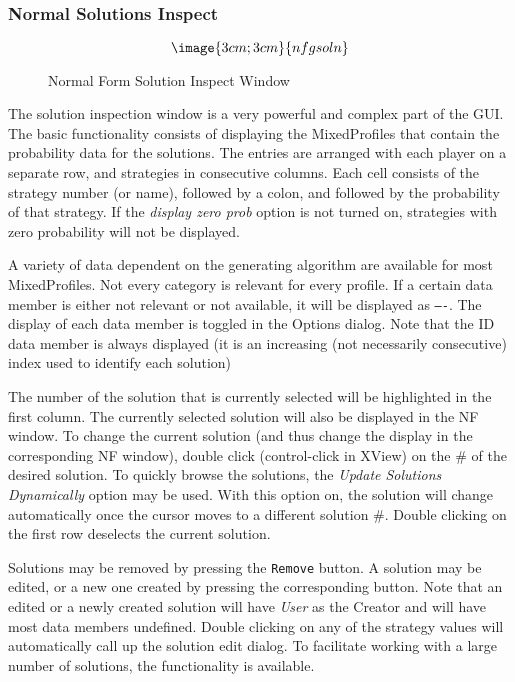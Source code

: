 \subsubsection{Normal Solutions Inspect}\label{NormalSolutionInspect}
\begin{figure}
$$\image{3cm;3cm}{nfgsoln}$$
\caption{Normal Form Solution Inspect Window}\label{fig_nfgsoln}
\end{figure}

The solution inspection window is a very powerful and complex part of the GUI.
The basic functionality consists of displaying the MixedProfiles that contain the
probability data for the solutions.  The entries are arranged with each 
player on a separate row, and strategies in consecutive columns.  
Each cell consists of the strategy number (or name), followed by a colon, and followed
by the probability of that strategy.
If the {\em display zero prob} option is not turned on, strategies with zero probability
will not be displayed. 

A variety of data dependent on the generating algorithm are available for most 
MixedProfiles. Not every category is relevant for every profile.  If a
certain data member is either not relevant or not available, it will be 
displayed as {\tt ----}.  The display of each data member is toggled in the
Options dialog.  Note that the ID data member is always displayed (it is
an increasing (not necessarily consecutive) index used to identify each
solution)

The number of the solution that is currently selected will be highlighted in the first
column.  The currently selected solution will also be displayed in the NF window.  
To change the current solution (and thus change the display in the 
corresponding NF window), double click (control-click in XView) on the \# of the
desired solution.  To quickly browse the solutions, the 
{\em Update Solutions Dynamically} 
option may be used.  With this option on, the solution will change automatically once
the cursor moves to a different solution \#.  Double clicking on the first
row deselects the current solution.

Solutions may be removed by pressing the {\tt Remove} button.  A solution may
be edited, or a new one created by pressing the corresponding button.  Note 
that an edited or a newly created solution will have {\em User} as the
Creator and will have most data members undefined.  Double clicking on any
of the strategy values will automatically call up the solution edit dialog.
To facilitate working with a large number of solutions, 
the  functionality is available.


